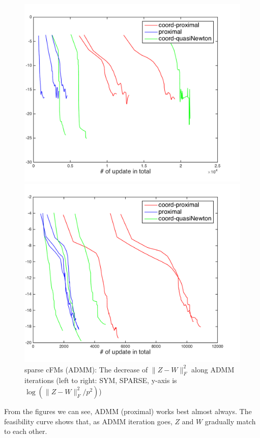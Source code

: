 \documentclass{article}
\begin{document}
\begin{figure}[ht!]
  \centering
  \begin{minipage}{0.45\textwidth}
    \centering
    \includegraphics[width=.6\textwidth]{../yanyu_code/plots/sym_ADMM_feasibility_p30}
  \end{minipage}
  \hfill
  \begin{minipage}{0.45\textwidth}
    \centering
    \includegraphics[width=.6\textwidth]{../yanyu_code/plots/sparse_ADMM_feasibility_p30}
  \end{minipage}
  \caption{sparse cFMs (ADMM): The decrease of $\|Z-W\|_F^2$ along ADMM iterations (left to right: SYM, SPARSE, y-axis is $\log(\|Z-W\|_F^2 / p^2)$)}
  \label{fig:feas}
\end{figure}
From the figures we can see, ADMM (proximal) works best almost always. The feasibility curve shows that, as ADMM iteration goes, $Z$ and $W$ gradually match to each other. 
\end{document}
